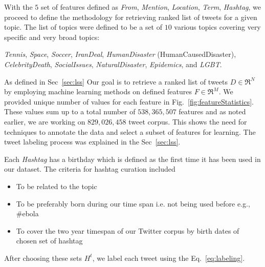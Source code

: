 

With the $5$ set of features defined as \textit{From}, \textit{Mention}, \textit{Location}, \textit{Term}, \textit{Hashtag}, we proceed to define the methodology for retrieving ranked list of tweets for a given topic. The list of topics were defined to be a set of $10$ various topics covering very specific and very broad topics:

\textit{Tennis}, \textit{Space}, \textit{Soccer}, \textit{IranDeal}, \textit{HumanDisaster} (HumanCausedDisaster), \textit{CelebrityDeath}, \textit{SocialIssues}, \textit{NaturalDisaster}, \textit{Epidemics}, and \textit{LGBT}. 

As defined in Sec~\ref{sec:lss} Our goal is to retrieve a ranked list of tweets $D \in \Re^{N}$ by employing machine learning methods on defined features $F \in \Re^{M}$. We provided unique number of values for each feature in Fig.~\ref{fig:featureStatistics}. These values sum up to a total number of $538,365,507$ features and as noted earlier, we are working on $829,026,458$ tweet corpus. This shows the need for techniques to annotate the data and select a subset of features for learning. The tweet labeling process was explained in the Sec~\ref{sec:lss}.

Each \textit{Hashtag} has a birthday which is defined as the first time it has been used in our dataset. The criteria for hashtag curation included
\begin{itemize}
\item To be related to the topic
\item To be preferably born during our time span i.e. not being used before e.g., \#ebola
\item To cover the two year timespan of our Twitter corpus by birth dates of chosen set of hashtag
\end{itemize}
After choosing these sets $H^{t}$, we label each tweet using the Eq.~\ref{eq:labeling}.

